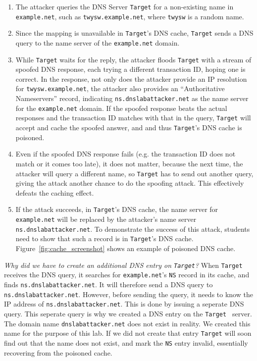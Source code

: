 \begin{enumerate}
\item The attacker queries the DNS Server {\tt Target} for a non-existing name in 
{\tt example.net}, such as {\tt twysw.example.net},
where {\tt twysw} is a random name. 

\item Since the mapping is unavailable in {\tt Target}'s DNS cache, 
{\tt Target} sends a DNS query to the name server of
the {\tt example.net} domain.

\item While {\tt Target} waits for the reply, 
the attacker floods {\tt Target} with a stream of spoofed DNS response\cite{bib6}, 
each trying a different transaction ID, hoping one is correct.
In the response, not only does the attacker provide an IP resolution
for {\tt twysw.example.net}, the attacker 
also provides an ``Authoritative Nameservers'' record, indicating 
{\tt ns.dnslabattacker.net} as the name server for the {\tt example.net} domain.
If the spoofed response beats the actual responses and
the transaction ID matches with that in the query, 
{\tt Target} will accept and cache the spoofed answer, and
and thus {\tt Target}'s DNS cache is poisoned.  

\item Even if the spoofed DNS response fails (e.g.
the transaction ID does not match or it comes too late),
it does not matter, because the next time, the attacker will query
a different name, so {\tt Target} has to send out another query, 
giving the attack another chance to do the spoofing attack. 
This effectively defeats the caching effect.


\item If the attack succeeds, in {\tt Target}'s DNS cache, the
name server for {\tt example.net} will be replaced by the attacker's
name server {\tt ns.dnslabattacker.net}.
To demonstrate the success of this attack, students need to show that such a record 
is in {\tt Target}'s DNS cache. Figure~\ref{fig:cache_screenshot} shows 
an example of poisoned DNS cache.

\end{enumerate}

{\em Why did we have to create an additional DNS entry on {\tt Target}?}  When {\tt Target} receives the DNS query, it searches
for {\tt example.net}'s {\tt NS} record in its cache,
and finds {\tt ns.dnslabattacker.net}.
It will therefore send a DNS query to {\tt ns.dnslabattacker.net}.
However, before sending the query, it needs to know the IP address of 
{\tt ns.dnslabattacker.net}. This is done by issuing a seperate DNS query. This seperate query is why we created a DNS entry on the {\tt Target } server.  The domain name {\tt dnslabattacker.net} does not exist in reality.
We created this name for the purpose of this lab. If we did not create that entry {\tt Target} will soon
find out that the name does not exist, and mark the {\tt NS} entry invalid, essentially recovering from the poisoned cache.


